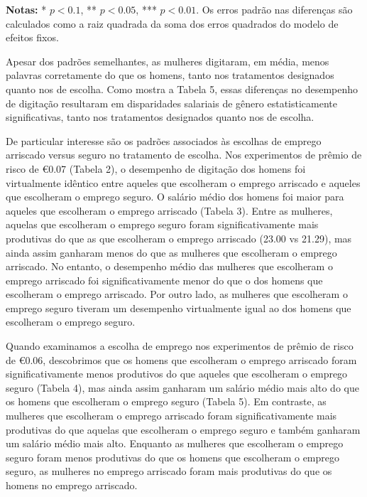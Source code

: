 \documentclass[a4paper,12pt]{article}[abntex2]
\begin{document}
\textbf{Notas:} * \( p < 0.1 \), ** \( p < 0.05 \), *** \( p < 0.01 \). Os erros padrão nas diferenças são calculados como a raiz quadrada da soma dos erros quadrados do modelo de efeitos fixos.

Apesar dos padrões semelhantes, as mulheres digitaram, em média, menos palavras corretamente do que os homens, tanto nos tratamentos designados quanto nos de escolha. Como mostra a Tabela 5, essas diferenças no desempenho de digitação resultaram em disparidades salariais de gênero estatisticamente significativas, tanto nos tratamentos designados quanto nos de escolha.

De particular interesse são os padrões associados às escolhas de emprego arriscado versus seguro no tratamento de escolha. Nos experimentos de prêmio de risco de €0.07 (Tabela 2), o desempenho de digitação dos homens foi virtualmente idêntico entre aqueles que escolheram o emprego arriscado e aqueles que escolheram o emprego seguro. O salário médio dos homens foi maior para aqueles que escolheram o emprego arriscado (Tabela 3). Entre as mulheres, aquelas que escolheram o emprego seguro foram significativamente mais produtivas do que as que escolheram o emprego arriscado (23.00 vs 21.29), mas ainda assim ganharam menos do que as mulheres que escolheram o emprego arriscado. No entanto, o desempenho médio das mulheres que escolheram o emprego arriscado foi significativamente menor do que o dos homens que escolheram o emprego arriscado. Por outro lado, as mulheres que escolheram o emprego seguro tiveram um desempenho virtualmente igual ao dos homens que escolheram o emprego seguro.

Quando examinamos a escolha de emprego nos experimentos de prêmio de risco de €0.06, descobrimos que os homens que escolheram o emprego arriscado foram significativamente menos produtivos do que aqueles que escolheram o emprego seguro (Tabela 4), mas ainda assim ganharam um salário médio mais alto do que os homens que escolheram o emprego seguro (Tabela 5). Em contraste, as mulheres que escolheram o emprego arriscado foram significativamente mais produtivas do que aquelas que escolheram o emprego seguro e também ganharam um salário médio mais alto. Enquanto as mulheres que escolheram o emprego seguro foram menos produtivas do que os homens que escolheram o emprego seguro, as mulheres no emprego arriscado foram mais produtivas do que os homens no emprego arriscado.
\end{document}
